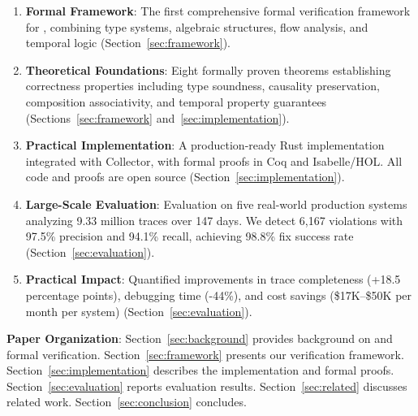 \begin{enumerate}
\item \textbf{Formal Framework}: The first comprehensive formal verification framework for \otlp, combining type systems, algebraic structures, flow analysis, and temporal logic (Section~\ref{sec:framework}).

\item \textbf{Theoretical Foundations}: Eight formally proven theorems establishing correctness properties including type soundness, causality preservation, composition associativity, and temporal property guarantees (Sections~\ref{sec:framework} and~\ref{sec:implementation}).

\item \textbf{Practical Implementation}: A production-ready Rust implementation integrated with \otel Collector, with formal proofs in Coq and Isabelle/HOL. All code and proofs are open source (Section~\ref{sec:implementation}).

\item \textbf{Large-Scale Evaluation}: Evaluation on five real-world production systems analyzing 9.33 million traces over 147 days. We detect 6,167 violations with 97.5\% precision and 94.1\% recall, achieving 98.8\% fix success rate (Section~\ref{sec:evaluation}).

\item \textbf{Practical Impact}: Quantified improvements in trace completeness (+18.5 percentage points), debugging time (-44\%), and cost savings (\$17K--\$50K per month per system) (Section~\ref{sec:evaluation}).
\end{enumerate}

\textbf{Paper Organization}: Section~\ref{sec:background} provides background on \otlp and formal verification. Section~\ref{sec:framework} presents our verification framework. Section~\ref{sec:implementation} describes the implementation and formal proofs. Section~\ref{sec:evaluation} reports evaluation results. Section~\ref{sec:related} discusses related work. Section~\ref{sec:conclusion} concludes.

